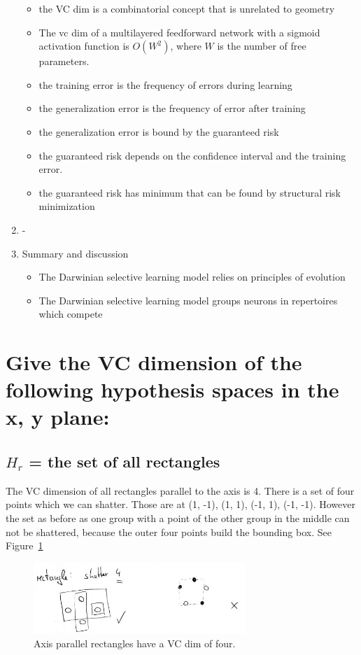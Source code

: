 \documentclass{scrartcl}
\begin{document}
\begin{enumerate}
\begin{itemize}
	\item the VC dim is a combinatorial concept that is unrelated to geometry
	\item The vc dim of a multilayered feedforward network with a sigmoid activation function is $O(W^{2})$, where $W$ is the number of free parameters.
	\item the training error is the frequency of errors during learning
	\item the generalization error is the frequency of error after training
	\item the generalization error is bound by the guaranteed risk
	\item the guaranteed risk depends on the confidence interval and the training error. 
	\item the guaranteed risk has minimum that can be found by structural risk minimization
	\end{itemize}
\item -

\item Summary and discussion
	\begin{itemize}
	\item The Darwinian selective learning model relies on principles of evolution
	\item The Darwinian selective learning model groups neurons in repertoires which compete
	\end{itemize}
\end{enumerate}

\section{Give the
VC dimension of the following hypothesis spaces in the x, y plane:
}

\subsection{$H_{r}$ = the set of all rectangles}
The VC dimension of all rectangles parallel to the axis is 4. There is a set of four points which we can shatter. Those are at (1, -1), (1, 1), (-1, 1), (-1, -1). However the set as before as one group with a point of the other group in the middle can not be shattered, because the outer four points build the bounding box. See Figure~\ref{fig:rectangle}

\begin{figure}
 \center
 \includegraphics[width= 8cm]{vcdim_rectangle.jpg}
 \caption{Axis parallel rectangles have a VC dim of four.}
 \label{fig:rectangle}
\end{figure}
\end{document}

